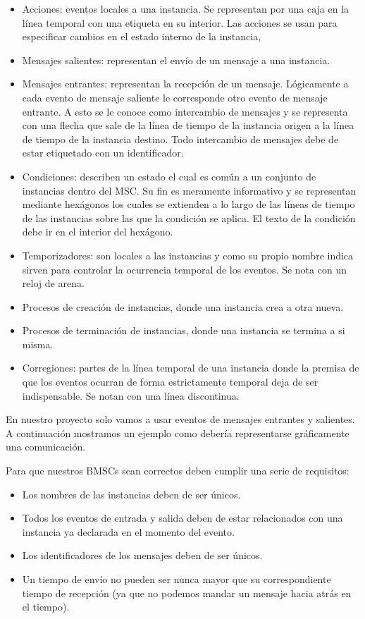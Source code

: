 \documentclass[12pt,a4paper]{report}
\begin{document}
\begin{itemize}
\item Acciones: eventos locales a una instancia. Se representan por una caja en la línea temporal con una etiqueta en su interior. Las acciones se usan para especificar cambios en el estado interno de la instancia,
\item Mensajes salientes: representan el envío de un mensaje a una instancia.
\item Mensajes entrantes: representan la recepción de un mensaje. Lógicamente a cada evento de mensaje saliente le corresponde otro evento de mensaje entrante. A esto se le conoce como intercambio de mensajes y se representa con una flecha que sale de la línea de tiempo de la instancia origen a la línea de tiempo de la instancia destino. Todo intercambio de mensajes debe de estar etiquetado con un identificador. 
\item Condiciones: describen un estado el cual es común a un conjunto de instancias dentro del MSC. Su fin es meramente informativo y se representan mediante hexágonos los cuales se extienden a lo largo de las líneas de tiempo de las instancias sobre las que la condición se aplica. El texto de la condición debe ir en el interior del hexágono.
\item Temporizadores: son locales a las instancias y como su propio nombre indica sirven para controlar la ocurrencia temporal de los eventos. Se nota con un reloj de arena.
\item Procesos de creación de instancias, donde una instancia crea a otra nueva.
\item Procesos de terminación de instancias, donde una instancia se termina a si misma.
\item Corregiones: partes de la línea temporal de una instancia donde la premisa de que los eventos ocurran de forma estrictamente temporal deja de ser indispensable. Se notan con una línea discontinua.
\end{itemize}

En nuestro proyecto solo vamos a usar eventos de mensajes entrantes y salientes. A continuación mostramos un ejemplo como debería representarse gráficamente una comunicación.


Para que nuestros BMSCs sean correctos deben cumplir una serie de requisitos:
\begin{itemize}
\item Los nombres de las instancias deben de ser únicos.
\item Todos los eventos de entrada y salida deben de estar relacionados con una instancia ya declarada en el momento del evento.
\item Los identificadores de los mensajes deben de ser únicos.
\item Un tiempo de envío no pueden ser nunca mayor que su correspondiente tiempo de recepción (ya que no podemos mandar un mensaje hacia atrás en el tiempo).
\end{itemize}
\end{document}
